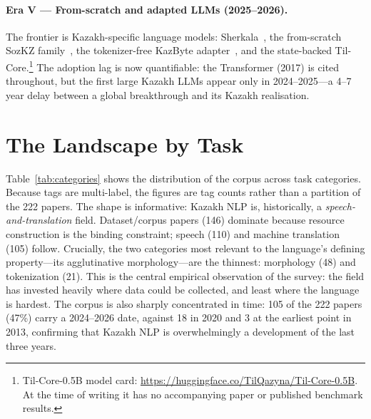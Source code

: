 \documentclass{article}
\begin{document}
\paragraph{Era V --- From-scratch and adapted LLMs (2025--2026).}
The frontier is Kazakh-specific language models: Sherkala~\cite{sherkala}, the from-scratch
SozKZ family~\cite{sozkz}, the tokenizer-free KazByte adapter~\cite{kazbyte}, and the
state-backed Til-Core.\footnote{Til-Core-0.5B model card:
\url{https://huggingface.co/TilQazyna/Til-Core-0.5B}. At the time of writing it has no
accompanying paper or published benchmark results.} The adoption lag is now quantifiable: the Transformer (2017) is
cited throughout, but the first large Kazakh LLMs appear only in 2024--2025---a 4--7 year
delay between a global breakthrough and its Kazakh realisation.

\section{The Landscape by Task}
\label{sec:landscape}
Table~\ref{tab:categories} shows the distribution of the corpus across task categories.
Because tags are multi-label, the figures are tag counts rather than a partition of the
222 papers. The shape is informative: Kazakh NLP is, historically, a
\emph{speech-and-translation} field. Dataset/corpus papers (146) dominate because resource
construction is the binding
constraint; speech (110) and machine translation (105) follow. Crucially, the two
categories most relevant to the language's defining property---its agglutinative
morphology---are the thinnest: morphology (48) and tokenization (21). This is the central
empirical observation of the survey: the field has invested heavily where data could be
collected, and least where the language is hardest. The corpus is also sharply concentrated
in time: 105 of the 222 papers (47\%) carry a 2024--2026 date, against 18 in 2020 and 3 at
the earliest point in 2013, confirming that Kazakh NLP is overwhelmingly a development of
the last three years.
\end{document}
